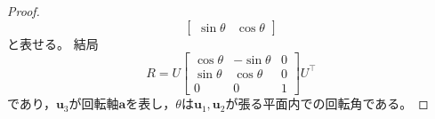 \begin{proof}
\[\begin{bmatrix}
                    \sin\theta & \cos\theta
                \end{bmatrix}
            \]
            と表せる。
            結局
            \[
                R = U\begin{bmatrix}
                    \cos\theta & -\sin\theta & 0 \\
                    \sin\theta & \cos\theta & 0 \\
                    0 & 0 & 1
                \end{bmatrix}U^\top
            \]
            であり，$\bm{u}_3$が回転軸$\bm{a}$を表し，$\theta$は$\bm{u}_1,\bm{u}_2$が張る平面内での回転角である。
        \end{proof}